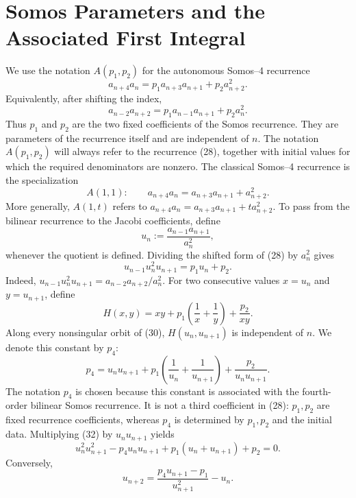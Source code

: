 \documentclass[11pt]{article}
\theoremstyle{remark}
\begin{document}
\section{Somos Parameters and the Associated First Integral}
We use the notation $A(p_1,p_2)$ for the autonomous Somos--4 recurrence
\begin{equation}
a_{n+4}a_n=p_1a_{n+3}a_{n+1}+p_2a_{n+2}^2.
\end{equation}
Equivalently, after shifting the index,
\[
a_{n-2}a_{n+2}=p_1a_{n-1}a_{n+1}+p_2a_n^2.
\]
Thus $p_1$ and $p_2$ are the two fixed coefficients of the Somos recurrence. They are parameters of the recurrence itself and are independent of $n$. The notation $A(p_1,p_2)$ will always refer to the recurrence (28), together with initial values for which the required denominators are nonzero. The classical Somos--4 recurrence is the specialization
\[
A(1,1):\qquad a_{n+4}a_n=a_{n+3}a_{n+1}+a_{n+2}^2.
\]
More generally, $A(1,t)$ refers to $a_{n+4}a_n=a_{n+3}a_{n+1}+ta_{n+2}^2$.
To pass from the bilinear recurrence to the Jacobi coefficients, define
\begin{equation}
u_n:=\frac{a_{n-1}a_{n+1}}{a_n^2},
\end{equation}
whenever the quotient is defined. Dividing the shifted form of (28) by $a_n^2$ gives
\begin{equation}
u_{n-1}u_n^2u_{n+1}=p_1u_n+p_2.
\end{equation}
Indeed, $u_{n-1}u_n^2u_{n+1}=a_{n-2}a_{n+2}/a_n^2$.
For two consecutive values $x=u_n$ and $y=u_{n+1}$, define
\begin{equation}
H(x,y)=xy+p_1\left(\frac1x+\frac1y\right)+\frac{p_2}{xy}.
\end{equation}
Along every nonsingular orbit of (30), $H(u_n,u_{n+1})$ is independent of $n$. We denote this constant by $p_4$:
\begin{equation}
p_4=u_nu_{n+1}+p_1\left(\frac1{u_n}+\frac1{u_{n+1}}\right)+\frac{p_2}{u_nu_{n+1}}.
\end{equation}
The notation $p_4$ is chosen because this constant is associated with the fourth-order bilinear Somos recurrence. It is not a third coefficient in (28): $p_1,p_2$ are fixed recurrence coefficients, whereas $p_4$ is determined by $p_1,p_2$ and the initial data. Multiplying (32) by $u_nu_{n+1}$ yields
\begin{equation}
u_n^2u_{n+1}^2-p_4u_nu_{n+1}+p_1(u_n+u_{n+1})+p_2=0.
\end{equation}
Conversely,
\begin{equation}
u_{n+2}=\frac{p_4u_{n+1}-p_1}{u_{n+1}^2}-u_n.
\end{equation}
\end{document}
